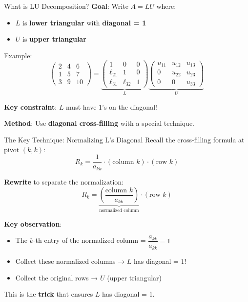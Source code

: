 \documentclass[10pt]{beamer}
\theoremstyle{definition}
\newcommand{\x}[1]{\alert{\textbf{#1}}}
\begin{document}
\begin{frame}{What is LU Decomposition?}
\textbf{Goal}: Write $A = LU$ where:
\begin{itemize}
\item $L$ is \x{lower triangular} with \x{diagonal = 1}
\item $U$ is \x{upper triangular}
\end{itemize}

\vfill
Example:
$$\begin{pmatrix}
2 & 4 & 6 \\
1 & 5 & 7 \\
3 & 9 & 10
\end{pmatrix}
= \underbrace{\begin{pmatrix}
1 & 0 & 0 \\
\ell_{21} & 1 & 0 \\
\ell_{31} & \ell_{32} & 1
\end{pmatrix}}_{L}
\underbrace{\begin{pmatrix}
u_{11} & u_{12} & u_{13} \\
0 & u_{22} & u_{23} \\
0 & 0 & u_{33}
\end{pmatrix}}_{U}$$

\vfill
\textbf{Key constraint}: $L$ must have $1$'s on the diagonal!

\vfill
\textbf{Method}: Use \x{diagonal cross-filling} with a special technique.
\end{frame}

\begin{frame}{The Key Technique: Normalizing L's Diagonal}
Recall the cross-filling formula at pivot $(k,k)$:
$$R_k = \frac{1}{a_{kk}} \cdot (\text{column } k) \cdot (\text{row } k)$$

\vfill
\textbf{Rewrite} to separate the normalization:
$$R_k = \underbrace{\left(\frac{\text{column } k}{a_{kk}}\right)}_{\text{normalized column}} \cdot (\text{row } k)$$

\vfill
\textbf{Key observation}:
\begin{itemize}
\item The $k$-th entry of the normalized column = $\dfrac{a_{kk}}{a_{kk}} = 1$
\item Collect these normalized columns → $L$ has diagonal = $1$!
\item Collect the original rows → $U$ (upper triangular)
\end{itemize}

\vfill
This is the \x{trick} that ensures $L$ has diagonal = 1.
\end{frame}
\end{document}

